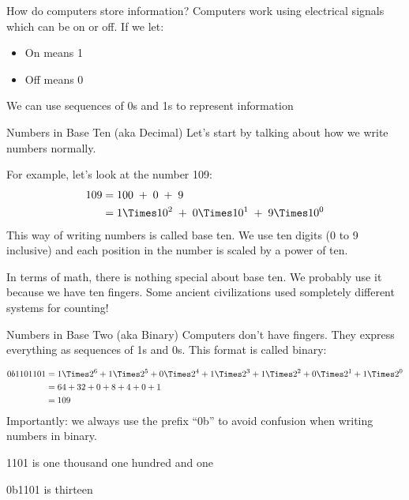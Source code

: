 

\begin{frame}{How do computers store information?}
	Computers work using electrical signals which can be on or off. If we let:
	\begin{itemize}
		\item On means 1
		\item Off means 0
	\end{itemize}
	We can use sequences of 0s and 1s to represent information
\end{frame}


\begin{frame}{Numbers in Base Ten (aka Decimal)}
	Let's start by talking about how we write numbers normally.

	For example, let's look at the number 109:
	\begin{align*}
		109 & = 100 \;+\; 0 \;+\; 9                                   \\
		    & = 1 \Times 10^2 \;+\; 0 \Times 10^1 \;+\; 9 \Times 10^0
	\end{align*}
	This way of writing numbers is called base ten.
	We use ten digits (0 to 9 inclusive) and each position in the number is scaled by a power of ten.

	In terms of math, there is nothing special about base ten. We probably use it
	because we have ten fingers. Some ancient civilizations used sompletely
	different systems for counting!
\end{frame}

\begin{frame}{Numbers in Base Two (aka Binary)}
	Computers don't have fingers. They express everything as sequences of 1s and 0s. This format is called binary:

	\begin{align*}
		0b1101101 & =
		1 \Times 2^6 +
		1 \Times 2^5 +
		0 \Times 2^4 +
		1 \Times 2^3 +
		1 \Times 2^2 +
		0 \Times 2^1 +
		1 \Times 2^0                              \\
		          & = 64 + 32 + 0 + 8 + 4 + 0 + 1 \\
		          & = 109                         \\
	\end{align*}
	Importantly: we always use the prefix ``0b'' to avoid confusion when writing numbers in binary.

	1101 is one thousand one hundred and one

	0b1101 is thirteen
\end{frame}

